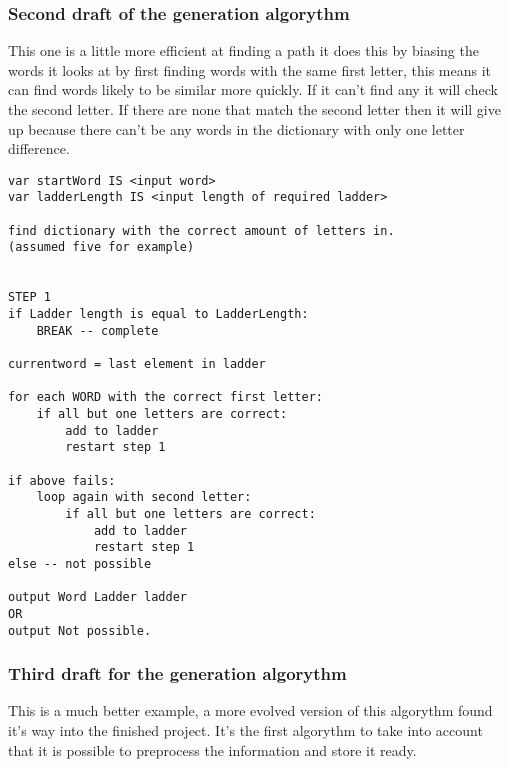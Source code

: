 \documentclass[final,a4paper,twoside,12pt]{report}
\begin{document}
\subsubsection{Second draft of the generation algorythm}
This one is a little more efficient at finding a path it does this 
by biasing the words it looks at by first finding words with the same
first letter, this means it can find words likely to be similar more
quickly. If it can't find any it will check the second letter. If there
are none that match the second letter then it will give up because
there can't be any words in the dictionary with only one letter 
difference.
\begin{verbatim}
var startWord IS <input word>
var ladderLength IS <input length of required ladder>

find dictionary with the correct amount of letters in. 
(assumed five for example)


STEP 1
if Ladder length is equal to LadderLength:
    BREAK -- complete

currentword = last element in ladder

for each WORD with the correct first letter:
    if all but one letters are correct:
        add to ladder
        restart step 1

if above fails:
    loop again with second letter:
        if all but one letters are correct:
            add to ladder
            restart step 1
else -- not possible

output Word Ladder ladder
OR
output Not possible.

\end{verbatim}

\subsubsection{Third draft for the generation algorythm}
This is a much better example, a more evolved version of this algorythm
found it's way into the finished project. It's the first algorythm to
take into account that it is possible to preprocess the information
and store it ready.
\end{document}
